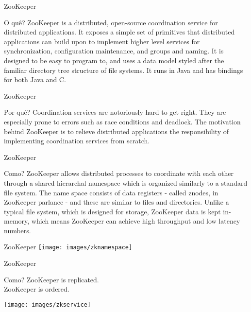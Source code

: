 \begin{frame}{ZooKeeper}
\begin{block}{O quê?}
	ZooKeeper is a \alert{distributed}, open-source \alert{coordination service for distributed applications}. It exposes a \alert{simple set of primitives} that distributed applications can build upon to implement higher level services for synchronization, configuration maintenance, and groups and naming. It is designed to be easy to program to, and uses a data model styled after the familiar \alert{directory tree structure of file systems}. It runs in Java and has bindings for both \alert{Java} and \alert{C}.
\end{block}
\end{frame}

\begin{frame}{ZooKeeper}
\begin{block}{Por quê?}
	Coordination services are notoriously hard to get right. They are especially prone to errors such as race conditions and deadlock. The motivation behind ZooKeeper is to relieve distributed applications the responsibility of implementing coordination services from scratch.
\end{block}
\end{frame}


\begin{frame}{ZooKeeper}
\begin{block}{Como?}
	ZooKeeper allows distributed processes to coordinate with each other through a \alert{shared hierarchal namespace which is organized similarly to a standard file system}. The name space consists of data registers - called \alert{znodes}, in ZooKeeper parlance - and these are \alert{similar to files and directories}. Unlike a typical file system, which is designed for storage, ZooKeeper data is kept \alert{in-memory}, which means ZooKeeper can achieve \alert{high throughput and low latency} numbers.
\end{block}

\end{frame}

\begin{frame}{ZooKeeper}
\texttt{[image: images/zknamespace]}
\end{frame}

\begin{frame}{ZooKeeper}
\begin{block}{Como?}
	ZooKeeper is replicated.\\
	ZooKeeper is ordered.
\end{block}

\texttt{[image: images/zkservice]}
\end{frame}

